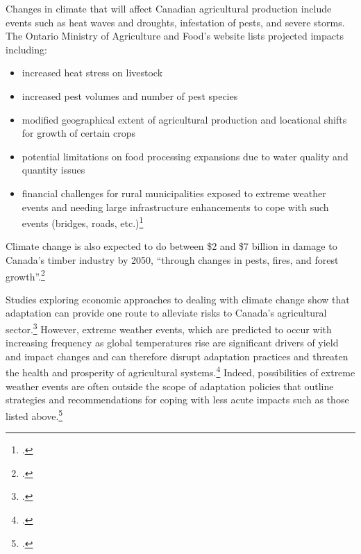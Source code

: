 Changes in climate that will affect Canadian agricultural production include events such as heat waves and droughts, infestation of pests, and severe storms.
The Ontario Ministry of Agriculture and Food's website lists projected impacts including:
\begin{itemize}
	\item increased heat stress on livestock
	\item increased pest volumes and number of pest species
	\item modified geographical extent of agricultural production and locational shifts for growth of certain crops
	\item potential limitations on food processing expansions due to water quality and quantity issues
	\item financial challenges for rural municipalities exposed to extreme weather events and needing large infrastructure enhancements to cope with such events (bridges, roads, etc.)\footcite{OntarioCCandAg}
\end{itemize}
Climate change is also expected to do between \$2 and \$7 billion in damage to Canada's timber industry by 2050, ``through changes in pests, fires, and forest growth''.\footcite[][p.16]{NRTEEPrice}



Studies exploring economic approaches to dealing with climate change show that adaptation can provide one route to alleviate risks to Canada's agricultural sector.\footcite{Amiraslany2010}
However, extreme weather events, which are predicted to occur with increasing frequency as global temperatures rise are significant drivers of yield and impact changes and can therefore disrupt adaptation practices and threaten the health and prosperity of agricultural systems.\footcite{IsikDevadoss2006}
Indeed, possibilities of extreme weather events are often outside the scope of adaptation policies that outline strategies and recommendations for coping with less acute impacts such as those listed above.\footcite[See for instance:][]{Malcolm2012}



